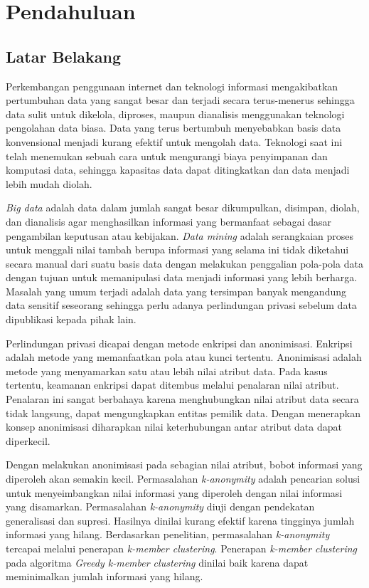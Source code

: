 \chapter{Pendahuluan}
\label{chap:intro}
   
\section{Latar Belakang}
\label{sec:label}
Perkembangan penggunaan internet dan teknologi informasi mengakibatkan pertumbuhan data yang sangat besar dan terjadi secara terus-menerus sehingga data sulit untuk dikelola, diproses, maupun dianalisis menggunakan teknologi pengolahan data biasa. Data yang terus bertumbuh menyebabkan basis data konvensional menjadi kurang efektif untuk mengolah data. Teknologi saat ini telah menemukan sebuah cara untuk mengurangi biaya penyimpanan dan komputasi data, sehingga kapasitas data dapat ditingkatkan dan data menjadi lebih mudah diolah.

{\it Big data} adalah data dalam jumlah sangat besar dikumpulkan, disimpan, diolah, dan dianalisis agar menghasilkan informasi yang bermanfaat sebagai dasar pengambilan keputusan atau kebijakan. {\it Data mining} adalah  serangkaian proses untuk menggali nilai tambah berupa informasi yang selama ini tidak diketahui secara manual dari suatu basis data dengan melakukan penggalian pola-pola data dengan tujuan untuk memanipulasi data menjadi informasi yang lebih berharga. Masalah yang umum terjadi adalah data yang tersimpan banyak mengandung data sensitif seseorang sehingga perlu adanya perlindungan privasi sebelum data dipublikasi kepada pihak lain.

Perlindungan privasi dicapai dengan metode enkripsi dan anonimisasi. Enkripsi adalah metode yang memanfaatkan pola atau kunci tertentu. Anonimisasi adalah metode yang menyamarkan satu atau lebih nilai atribut data. Pada kasus tertentu, keamanan enkripsi dapat ditembus melalui penalaran nilai atribut. Penalaran ini sangat berbahaya karena menghubungkan nilai atribut data secara tidak langsung, dapat mengungkapkan entitas pemilik data. Dengan menerapkan konsep anonimisasi diharapkan nilai keterhubungan antar atribut data dapat diperkecil.

Dengan melakukan anonimisasi pada sebagian nilai atribut, bobot informasi yang diperoleh akan semakin kecil. Permasalahan {\it k-anonymity} adalah pencarian solusi untuk menyeimbangkan nilai informasi yang diperoleh dengan nilai informasi yang disamarkan. Permasalahan {\it k-anonymity} diuji dengan pendekatan generalisasi dan supresi. Hasilnya dinilai kurang efektif karena tingginya jumlah informasi yang hilang. Berdasarkan penelitian, permasalahan {\it k-anonymity} tercapai melalui penerapan {\it k-member clustering}. Penerapan {\it k-member clustering} pada algoritma {\it Greedy k-member clustering} dinilai baik karena dapat meminimalkan jumlah informasi yang hilang.

